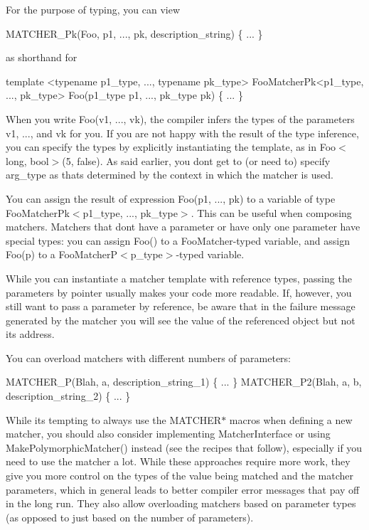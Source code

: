 For the purpose of typing, you can view 
\begin{DoxyCode}
MATCHER\_Pk(Foo, p1, ..., pk, description\_string) \{ ... \}
\end{DoxyCode}
 as shorthand for 
\begin{DoxyCode}
\textcolor{keyword}{template} <\textcolor{keyword}{typename} p1\_type, ..., \textcolor{keyword}{typename} pk\_type>
FooMatcherPk<p1\_type, ..., pk\_type>
Foo(p1\_type p1, ..., pk\_type pk) \{ ... \}
\end{DoxyCode}


When you write {\ttfamily Foo(v1, ..., vk)}, the compiler infers the types of the parameters {\ttfamily v1}, ..., and {\ttfamily vk} for you. If you are not happy with the result of the type inference, you can specify the types by explicitly instantiating the template, as in {\ttfamily Foo$<$long, bool$>$(5, false)}. As said earlier, you don\textquotesingle{}t get to (or need to) specify {\ttfamily arg\+\_\+type} as that\textquotesingle{}s determined by the context in which the matcher is used.

You can assign the result of expression {\ttfamily Foo(p1, ..., pk)} to a variable of type {\ttfamily Foo\+Matcher\+Pk$<$p1\+\_\+type, ..., pk\+\_\+type$>$}. This can be useful when composing matchers. Matchers that don\textquotesingle{}t have a parameter or have only one parameter have special types\+: you can assign {\ttfamily Foo()} to a {\ttfamily Foo\+Matcher}-\/typed variable, and assign {\ttfamily Foo(p)} to a {\ttfamily Foo\+MatcherP$<$p\+\_\+type$>$}-\/typed variable.

While you can instantiate a matcher template with reference types, passing the parameters by pointer usually makes your code more readable. If, however, you still want to pass a parameter by reference, be aware that in the failure message generated by the matcher you will see the value of the referenced object but not its address.

You can overload matchers with different numbers of parameters\+: 
\begin{DoxyCode}
MATCHER\_P(Blah, a, description\_string\_1) \{ ... \}
MATCHER\_P2(Blah, a, b, description\_string\_2) \{ ... \}
\end{DoxyCode}


While it\textquotesingle{}s tempting to always use the {\ttfamily M\+A\+T\+C\+H\+E\+R$\ast$} macros when defining a new matcher, you should also consider implementing {\ttfamily Matcher\+Interface} or using {\ttfamily Make\+Polymorphic\+Matcher()} instead (see the recipes that follow), especially if you need to use the matcher a lot. While these approaches require more work, they give you more control on the types of the value being matched and the matcher parameters, which in general leads to better compiler error messages that pay off in the long run. They also allow overloading matchers based on parameter types (as opposed to just based on the number of parameters).

